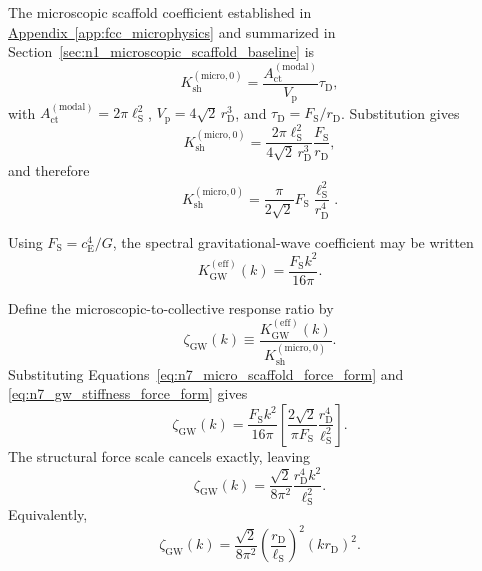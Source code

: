 The microscopic scaffold coefficient established in \hyperref[app:fcc_microphysics]{Appendix~\ref*{app:fcc_microphysics}} and summarized in Section~\ref{sec:n1_microscopic_scaffold_baseline} is
\begin{equation}
    K_{\mathrm{sh}}^{(\mathrm{micro},0)} = \frac{A_{\mathrm{ct}}^{(\mathrm{modal})}}{V_{\mathrm{p}}} \tau_{\mathrm{D}},
    \label{eq:n7_micro_scaffold_start}
\end{equation}
with $A_{\mathrm{ct}}^{(\mathrm{modal})} = 2\pi\ell_{\mathrm{S}}^{2}$, $V_{\mathrm{p}} = 4\sqrt{2}\,r_{\mathrm{D}}^{3}$, and $\tau_{\mathrm{D}} = F_{\mathrm{S}}/r_{\mathrm{D}}$. Substitution gives
\begin{equation}
    K_{\mathrm{sh}}^{(\mathrm{micro},0)} = \frac{2\pi\ell_{\mathrm{S}}^{2}}{4\sqrt{2}\,r_{\mathrm{D}}^{3}} \frac{F_{\mathrm{S}}}{r_{\mathrm{D}}},
\end{equation}
and therefore
\begin{equation}
    K_{\mathrm{sh}}^{(\mathrm{micro},0)} = \frac{\pi}{2\sqrt{2}} F_{\mathrm{S}} \frac{\ell_{\mathrm{S}}^{2}}{r_{\mathrm{D}}^{4}}.
    \label{eq:n7_micro_scaffold_force_form}
\end{equation}

Using $F_{\mathrm{S}} = c_{\mathrm{E}}^{4}/G$, the spectral gravitational-wave coefficient may be written
\begin{equation}
    K_{\mathrm{GW}}^{(\mathrm{eff})}(k) = \frac{F_{\mathrm{S}}k^{2}}{16\pi}.
    \label{eq:n7_gw_stiffness_force_form}
\end{equation}

Define the microscopic-to-collective response ratio by
\begin{equation}
    \zeta_{\mathrm{GW}}(k) \equiv \frac{K_{\mathrm{GW}}^{(\mathrm{eff})}(k)}{K_{\mathrm{sh}}^{(\mathrm{micro},0)}}.
    \label{eq:n7_zeta_definition}
\end{equation}
Substituting Equations~\eqref{eq:n7_micro_scaffold_force_form} and \eqref{eq:n7_gw_stiffness_force_form} gives
\begin{equation}
    \zeta_{\mathrm{GW}}(k) = \frac{F_{\mathrm{S}}k^{2}}{16\pi} \left[ \frac{2\sqrt{2}}{\pi F_{\mathrm{S}}} \frac{r_{\mathrm{D}}^{4}}{\ell_{\mathrm{S}}^{2}} \right].
\end{equation}
The structural force scale cancels exactly, leaving
\begin{equation}
    \zeta_{\mathrm{GW}}(k) = \frac{\sqrt{2}}{8\pi^{2}} \frac{r_{\mathrm{D}}^{4}k^{2}}{\ell_{\mathrm{S}}^{2}}.
    \label{eq:n7_zeta_dimensional_form}
\end{equation}
Equivalently,
\begin{equation}
    \zeta_{\mathrm{GW}}(k) = \frac{\sqrt{2}}{8\pi^{2}} \left( \frac{r_{\mathrm{D}}}{\ell_{\mathrm{S}}} \right)^{2} \left( kr_{\mathrm{D}} \right)^{2}.
    \label{eq:n7_zeta_k}
\end{equation}

